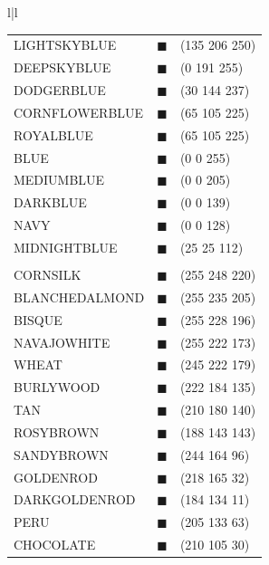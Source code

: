 \begin{table}[t]
{\begin{center}
\begin{tabular}{l|l}
\begin{tabular}{lll}
LIGHTSKYBLUE		& {\color[RGB]{135,206,250}$\blacksquare$}	& (135 206 250)	\\
DEEPSKYBLUE			& {\color[RGB]{0,191,255}$\blacksquare$}	& (0 191 255)	\\
DODGERBLUE			& {\color[RGB]{30,144,255}$\blacksquare$}	& (30 144 237)	\\
CORNFLOWERBLUE		& {\color[RGB]{100,149,237}$\blacksquare$}	& (65 105 225)	\\
ROYALBLUE			& {\color[RGB]{65,105,225}$\blacksquare$}	& (65 105 225)	\\
BLUE				& {\color[RGB]{0,0,255}$\blacksquare$}	& (0 0 255)	\\
MEDIUMBLUE			& {\color[RGB]{0,0,205}$\blacksquare$}	& (0 0 205)	\\
DARKBLUE			& {\color[RGB]{0,0,139}$\blacksquare$}	& (0 0 139)	\\
NAVY				& {\color[RGB]{0,0,128}$\blacksquare$}	& (0 0 128)	\\
MIDNIGHTBLUE		& {\color[RGB]{25,25,112}$\blacksquare$}	& (25 25 112)	\\
\\
CORNSILK			& {\color[RGB]{255,248,220}$\blacksquare$}	& (255 248 220)	\\
BLANCHEDALMOND		& {\color[RGB]{255,235,205}$\blacksquare$}	& (255 235 205)	\\
BISQUE				& {\color[RGB]{255,228,196}$\blacksquare$}	& (255 228 196)	\\
NAVAJOWHITE			& {\color[RGB]{255,222,173}$\blacksquare$}	& (255 222 173)	\\
WHEAT				& {\color[RGB]{245,222,179}$\blacksquare$}	& (245 222 179)	\\
BURLYWOOD			& {\color[RGB]{222,184,135}$\blacksquare$}	& (222 184 135)	\\
TAN					& {\color[RGB]{210,180,140}$\blacksquare$}	& (210 180 140)	\\
ROSYBROWN			& {\color[RGB]{188,143,143}$\blacksquare$}	& (188 143 143)	\\
SANDYBROWN			& {\color[RGB]{244,164,96}$\blacksquare$}	& (244 164 96)	\\
GOLDENROD			& {\color[RGB]{218,165,32}$\blacksquare$}	& (218 165 32)	\\
DARKGOLDENROD		& {\color[RGB]{184,134,11}$\blacksquare$}	& (184 134 11)	\\
PERU				& {\color[RGB]{205,133,63}$\blacksquare$}	& (205 133 63)	\\
CHOCOLATE			& {\color[RGB]{210,105,30}$\blacksquare$}	& (210 105 30)	\\

\end{tabular}
\end{tabular}
\end{center}}
\end{table}
